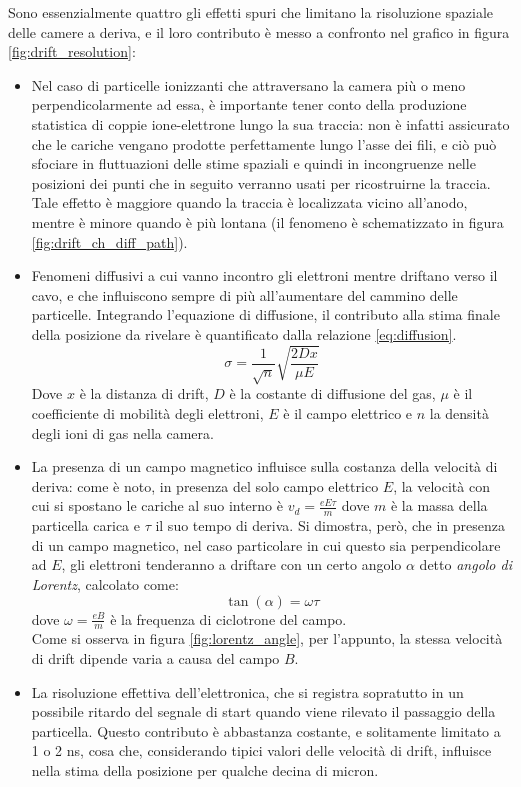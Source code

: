 \documentclass[a4paper,11pt]{book}
\begin{document}
Sono essenzialmente quattro gli effetti spuri che limitano la risoluzione spaziale delle camere a deriva, e il loro contributo è messo a confronto nel grafico in figura \ref{fig:drift_resolution}:
\begin{itemize}
\item Nel caso di particelle ionizzanti che attraversano la camera più o meno perpendicolarmente ad essa, è importante tener conto della produzione statistica di coppie ione-elettrone lungo la sua traccia: non è infatti assicurato che le cariche vengano prodotte perfettamente lungo l'asse dei fili, e ciò può sfociare in fluttuazioni delle stime spaziali e quindi in incongruenze nelle posizioni dei punti che in seguito verranno usati per ricostruirne la traccia. Tale effetto è maggiore quando la traccia è localizzata vicino all'anodo, mentre è minore quando è più lontana (il fenomeno è schematizzato in figura \ref{fig:drift_ch_diff_path}).
\item Fenomeni diffusivi a cui vanno incontro gli elettroni mentre driftano verso il cavo, e che influiscono sempre di più all'aumentare del cammino delle particelle. Integrando l'equazione di diffusione, il contributo alla stima finale della posizione da rivelare è quantificato dalla relazione \ref{eq:diffusion}.
\begin{equation}
\label{eq:diffusion}
\sigma = \frac{1}{\sqrt{n}}\sqrt{\frac{2Dx}{\mu E}}
\end{equation}
Dove $x$ è la distanza di drift, $D$ è la costante di diffusione del gas, $\mu$ è il coefficiente di mobilità degli elettroni, $E$ è il campo elettrico e $n$ la densità degli ioni di gas nella camera.\\
\item La presenza di un campo magnetico influisce sulla costanza della velocità di deriva: come è noto, in presenza del solo campo elettrico $E$, la velocità con cui si spostano le cariche al suo interno è $v_d = \frac{eE\tau}{m}$ dove $m$ è la massa della particella carica e $\tau$ il suo tempo di deriva. Si dimostra, però, che in presenza di un campo magnetico, nel caso particolare in cui questo sia perpendicolare ad $E$, gli elettroni tenderanno a driftare con un certo angolo $\alpha$ detto \textit{angolo di Lorentz}, calcolato come:
\[ \tan(\alpha) = \omega\tau \]
dove $\omega = \frac{eB}{m}$ è la frequenza di ciclotrone del campo.\\
Come si osserva in figura \ref{fig:lorentz_angle}, per l'appunto, la stessa velocità di drift dipende varia a causa del campo $B$.
\item La risoluzione effettiva dell'elettronica, che si registra sopratutto in un possibile ritardo del segnale di start quando viene rilevato il passaggio della particella. Questo contributo è abbastanza costante, e solitamente limitato a 1 o 2 ns, cosa che, considerando tipici valori delle velocità di drift, influisce nella stima della posizione per qualche decina di micron.
\end{itemize}
\end{document}
